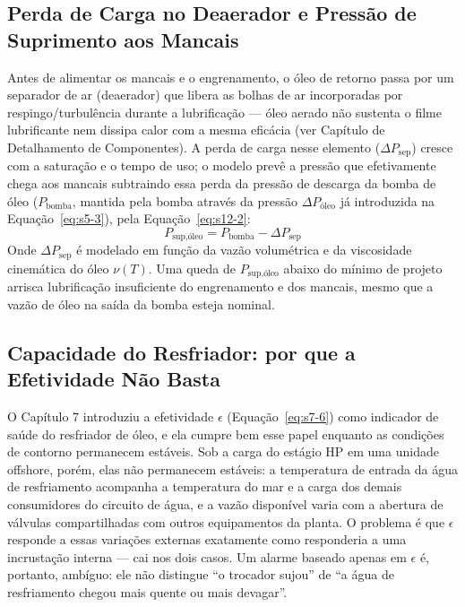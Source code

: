 \documentclass[12pt,a4paper]{article}
\numberwithin{equation}{section}
\numberwithin{table}{section}
\numberwithin{figure}{section}
\begin{document}
	\subsection{\textbf{Perda de Carga no Deaerador e Pressão de Suprimento aos Mancais}}
	Antes de alimentar os mancais e o engrenamento, o óleo de retorno passa por um separador de ar (deaerador) que libera as bolhas de ar incorporadas por respingo/turbulência durante a lubrificação — óleo aerado não sustenta o filme lubrificante nem dissipa calor com a mesma eficácia (ver Capítulo de Detalhamento de Componentes). A perda de carga nesse elemento ($\Delta P_{\text{sep}}$) cresce com a saturação e o tempo de uso; o modelo prevê a pressão que efetivamente chega aos mancais subtraindo essa perda da pressão de descarga da bomba de óleo ($P_{\text{bomba}}$, mantida pela bomba através da pressão $\Delta P_{\text{óleo}}$ já introduzida na Equação~\eqref{eq:s5-3}), pela Equação~\eqref{eq:s12-2}:
	\begin{equation}\label{eq:s12-2}
 P_{\text{sup,óleo}} = P_{\text{bomba}} - \Delta P_{\text{sep}}
\end{equation}
	Onde $\Delta P_{\text{sep}}$ é modelado em função da vazão volumétrica e da viscosidade cinemática do óleo $\nu(T)$. Uma queda de $P_{\text{sup,óleo}}$ abaixo do mínimo de projeto arrisca lubrificação insuficiente do engrenamento e dos mancais, mesmo que a vazão de óleo na saída da bomba esteja nominal.

	\subsection{\textbf{Capacidade do Resfriador: por que a Efetividade Não Basta}}
	O Capítulo 7 introduziu a efetividade $\epsilon$ (Equação~\eqref{eq:s7-6}) como indicador de saúde do resfriador de óleo, e ela cumpre bem esse papel enquanto as condições de contorno permanecem estáveis. Sob a carga do estágio HP em uma unidade offshore, porém, elas não permanecem estáveis: a temperatura de entrada da água de resfriamento acompanha a temperatura do mar e a carga dos demais consumidores do circuito de água, e a vazão disponível varia com a abertura de válvulas compartilhadas com outros equipamentos da planta. O problema é que $\epsilon$ responde a essas variações externas exatamente como responderia a uma incrustação interna — cai nos dois casos. Um alarme baseado apenas em $\epsilon$ é, portanto, ambíguo: ele não distingue ``o trocador sujou'' de ``a água de resfriamento chegou mais quente ou mais devagar''.
\end{document}
